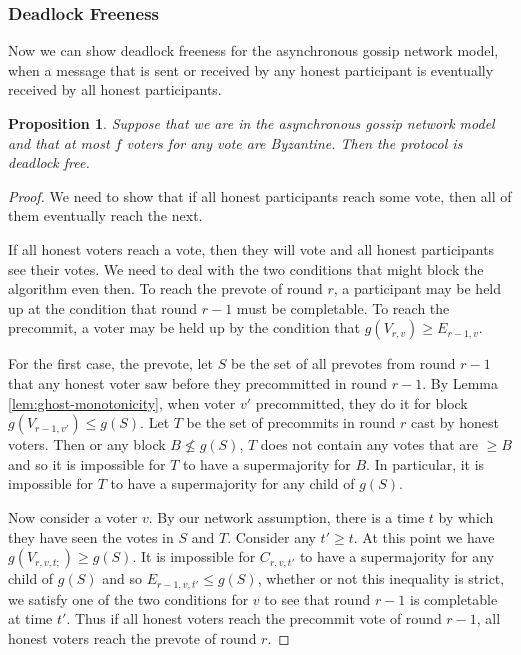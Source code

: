 \documentclass{article}
\newtheorem{proposition}[theorem]{Proposition}
\begin{document}
{\subsubsection{Deadlock Freeness}

Now we can show deadlock freeness for the asynchronous gossip network model, when a message that is sent or received by any honest participant is eventually received by all honest participants.

\begin{proposition} Suppose that we are in the asynchronous gossip network model and that at most $f$ voters for any vote are Byzantine. Then the protocol is deadlock free.\end{proposition}

\begin{proof} We need to show that if all honest participants reach some vote, then all of them eventually reach the next.

If all honest voters reach a vote, then they will vote and all honest participants see their votes. We need to deal with the two conditions that might block the algorithm even then. To reach the prevote of round $r$, a participant may be held up at the condition that round $r-1$ must be completable. To reach the precommit, a voter may be held up by the condition that $g(V_{r,v}) \geq E_{r-1,v}$.

For the first case, the prevote, let $S$ be the set of all prevotes from round $r-1$ that any honest voter saw before they precommitted in round $r-1$.
By Lemma \ref{lem:ghost-monotonicity}, when voter $v'$ precommitted, they do it for block $g(V_{r-1,v'}) \leq g(S)
$. Let $T$ be the set of precommits in round $r$ cast by honest voters. Then or any block $B \not\leq g(S)$, $T$ does not contain any votes that are $\geq B$ and so it is impossible for $T$ to have a supermajority for $B$. In particular, it is impossible for $T$ to have a supermajority for any child of $g(S)$. 

Now consider a voter $v$. By our network assumption, there is a time $t$ by which they have seen the votes in $S$ and $T$. Consider any $t' \geq t$. At this point we have $g(V_{r,v,t;}) \geq g(S)$. It is impossible for $C_{r,v,t'}$ to have a supermajority for any child of $g(S)$ and so $E_{r-1,v,t'} \leq g(S)$, whether or not this inequality is strict, we satisfy one of the two conditions for $v$ to see that round $r-1$ is completable at time $t'$. Thus if all honest voters reach the precommit vote of round $r-1$, all honest voters reach the prevote of round $r$.


\end{proof}}
\end{document}
